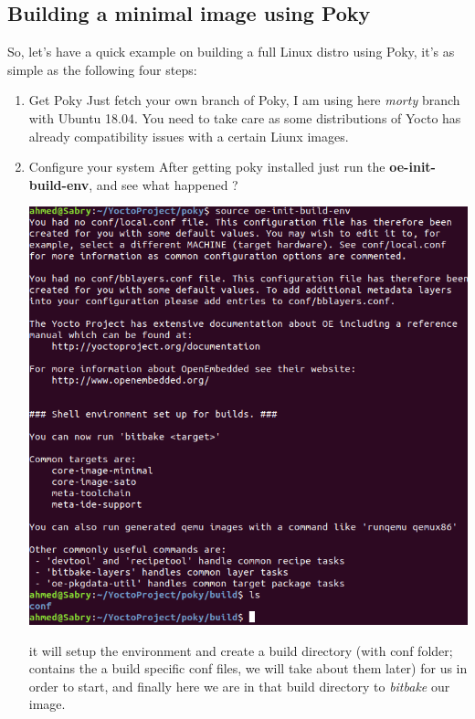 \documentclass{article}
\begin{document}
\subsection{Building a minimal image using Poky}
So, let's have a quick example on building a full Linux distro using Poky, it's as simple as the following four steps:

\begin{enumerate}
  \item Get Poky
  Just fetch your own branch of Poky, I am using here \textit{morty} branch with Ubuntu 18.04. You need to take care as some distributions of Yocto has already compatibility issues with a certain Liunx images.
  
  
  \item Configure your system
  After getting poky installed just run the \textbf{oe-init-build-env}, and see what happened ?\\
  
  
  \begin{center}
  \includegraphics[scale=0.60]{./resources/img/init-env-script.png}
  \end{center}
  it will setup the environment and create a build directory (with conf folder; contains the a build specific conf files, we will take about them later) for us in order to start, and finally here we are in that build directory to \textit{bitbake} our image.
  

\end{enumerate}
\end{document}
